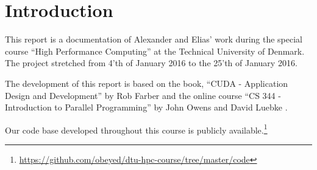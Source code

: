 \chapter{Introduction}
\label{chap:introduction}

This report is a documentation of Alexander and Elias' work during the special course ``High Performance Computing'' at the Technical University of Denmark.
The project stretched from 4'th of January 2016 to the 25'th of January 2016.

The development of this report is based on the book, ``CUDA - Application Design and Development'' by Rob Farber \cite{farber2011cuda} and the online course ``CS 344 - Introduction to Parallel Programming'' by John Owens and David Luebke \cite{udacity}.

Our code base developed throughout this course is publicly available.\footnote{\href{https://github.com/obeyed/dtu-hpc-course/tree/master/code}{https://github.com/obeyed/dtu-hpc-course/tree/master/code}}



